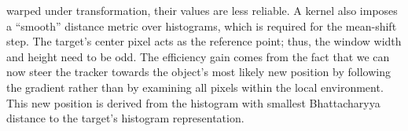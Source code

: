 \documentclass[a4paper,11pt]{article}
\begin{document}
		warped under transformation, their values are less reliable. A kernel
		also imposes a ``smooth'' distance metric over histograms, which is
		required for the mean-shift step. The target's center pixel acts as the
		reference point; thus, the window width and height need to be odd.
		The efficiency gain comes from the fact that we can now steer the
		tracker towards the object's most likely new position by following
		the gradient rather than by examining all pixels within the local
		environment. This new position is derived from the histogram with
		smallest Bhattacharyya distance to the target's histogram representation.
		\\ \\
\end{document}
